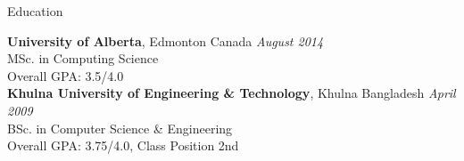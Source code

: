 \documentclass{resume} %
\begin{document}

\begin{rSection}{Education}

{\bf University of Alberta}, Edmonton Canada \hfill {\em August 2014}\\ 
MSc. in Computing Science \\
Overall GPA: 3.5/4.0\\
{\bf Khulna University of Engineering \& Technology}, Khulna Bangladesh \hfill {\em April 2009} \\ 
BSc. in Computer Science \& Engineering\\
Overall GPA: 3.75/4.0, Class Position 2nd

\end{rSection}

\end{document}

